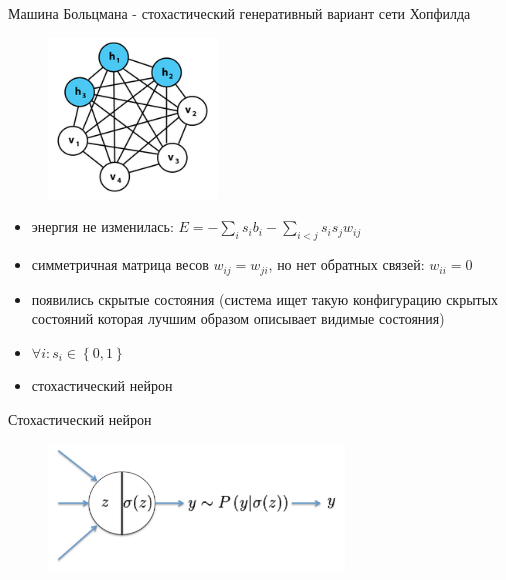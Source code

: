 \documentclass[10pt]{beamer}
\begin{document}
\begin{frame}{Машина Больцмана - стохастический генеративный вариант сети Хопфилда}

\begin{figure}[h!]
  \centering
  \includegraphics[width=0.4\textwidth]{images/bm.png}
\end{figure}
\begin{itemize}
	\item энергия не изменилась: $E = -\sum_i s_i b_i - \sum_{i < j} s_i s_j w_{ij}$
	\item симметричная матрица весов $w_{ij} = w_{ji}$, но нет обратных связей: $w_{ii} = 0$
	\item появились скрытые состояния (система ищет такую конфигурацию скрытых состояний которая лучшим образом описывает видимые состояния)
	\item $\forall i: s_i \in \left\{0, 1\right\}$
	\item стохастический нейрон
\end{itemize}

\end{frame}


\begin{frame}{Стохастический нейрон}

\begin{figure}[h!]
  \centering
  \includegraphics[width=0.7\textwidth]{images/stocastic_neuron.png}
\end{figure}

\end{frame}
\end{document}
